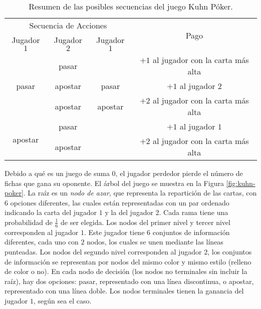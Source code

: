 \begin{table}[h]
\begin{center}
\caption[Resumen de las posibles secuencias del juego Kuhn Póker]{Resumen de las posibles secuencias del juego Kuhn Póker.}
\label{table:kuhn-poker}
\begin{tabular}{ c c c c }
\toprule
\multicolumn{3}{c}{Secuencia de Acciones} & \multirow{2}{*}{Pago} \\ \cmidrule{1-3}
Jugador $1$ & Jugador $2$ & Jugador $1$ &  \\ \midrule
\multirow{3}{*}{pasar} & pasar & & $+1$ al jugador con la carta más alta\\
& apostar & pasar & $+1$ al jugador $2$\\
& apostar & apostar & $+2$ al jugador con la carta más alta \\ \midrule
\multirow{2}{*}{apostar} & pasar & & $+1$ al jugador $1$ \\
& apostar & &  $+2$ al jugador con la carta más alta \\ \bottomrule
\end{tabular}
\end{center}
\end{table}

Debido a qué es un juego de suma $0$, el jugador perdedor pierde el número de fichas que gana su oponente. El árbol del juego se muestra en la Figura \ref{fig:kuhn-poker}. La raíz es un \textit{nodo de azar}, que representa la repartición de las cartas, con $6$ opciones diferentes, las cuales están representadas con un par ordenado indicando la carta del jugador $1$ y la del jugador $2$. Cada rama tiene una probabilidad de $\frac{1}{6}$ de ser elegida. Los nodos del primer nivel y tercer nivel corresponden al jugador $1$. Este jugador tiene $6$ conjuntos de información diferentes, cada uno con $2$ nodos, los cuales se unen mediante las líneas punteadas. Los nodos del segundo nivel corresponden al jugador $2$, los conjuntos de información se representan por nodos del mismo color y mismo estilo (relleno de color o no). En cada nodo de decisión (los nodos no terminales sin incluir la raíz), hay dos opciones: pasar, representado con una línea discontinua, o apostar, representado con una línea doble. Los nodos terminales tienen la ganancia del jugador $1$, según sea el caso.

